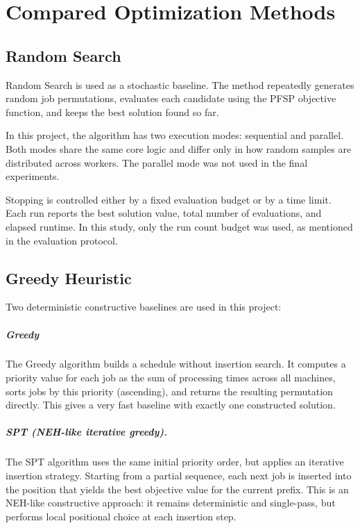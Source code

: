 \documentclass[12pt,a4paper]{report}
\begin{document}
\chapter{Compared Optimization Methods}
\section{Random Search}
Random Search is used as a stochastic baseline. The method repeatedly generates random job permutations, evaluates each candidate using the PFSP objective function, and keeps the best solution found so far.

In this project, the algorithm has two execution modes: sequential and parallel. Both modes share the same core logic and differ only in how random samples are distributed across workers. The parallel mode was not used in the final experiments.

Stopping is controlled either by a fixed evaluation budget or by a time limit. Each run reports the best solution value, total number of evaluations, and elapsed runtime. In this study, only the run count budget was used, as mentioned in the evaluation protocol.

\section{Greedy Heuristic}
Two deterministic constructive baselines are used in this project:

\paragraph{Greedy}
The Greedy algorithm builds a schedule without insertion search. It computes a priority value for each job as the sum of processing times across all machines, sorts jobs by this priority (ascending), and returns the resulting permutation directly. This gives a very fast baseline with exactly one constructed solution.

\paragraph{SPT (NEH-like iterative greedy).}
The SPT algorithm uses the same initial priority order, but applies an iterative insertion strategy. Starting from a partial sequence, each next job is inserted into the position that yields the best objective value for the current prefix. This is an NEH-like constructive approach: it remains deterministic and single-pass, but performs local positional choice at each insertion step.
\end{document}
